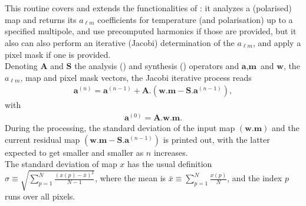 
\sloppy


 \section[map2alm\_iterative*]{ }
\label{sub:map2alm_iterative}
\author{Eric Hivon}

\begin{facility}
{This routine covers and extends the functionalities of : it
analyzes a (polarised)  map and returns
its $a_{\ell m}$ coefficients for temperature (and polarisation) up to a specified
multipole, and use precomputed harmonics if those
are provided, but it also can also perform an iterative (Jacobi) determination of the $a_{\ell m}$, and
apply a pixel mask if one is provided.\\
\newcommand{\bA}{\textbf{A}}
\newcommand{\bS}{\textbf{S}}
\newcommand{\ba}{\textbf{a}}
\newcommand{\bm}{\textbf{m}}
\newcommand{\bw}{\textbf{w}}
Denoting $\bA$ and $\bS$ the 
analysis  () and
synthesis ()
operators and  $\ba, \bm$ and $\bw$, the $a_{\ell m}$, map and pixel mask vectors, the
Jacobi iterative process reads 
\begin{eqnarray}
	\label{eq:map2alm_it_a}
	\ba^{(n)} = \ba^{(n-1)} + \bA. \left( \bw.\bm - \bS .\ba^{(n-1)} \right),
\end{eqnarray}
with
\begin{eqnarray}
	\label{eq:map2alm_it_b}
	\ba^{(0)} = \bA.\bw.\bm.
\end{eqnarray}
%
During the processing, the standard deviation of the input map $\left(\bw.\bm\right)$ 
and the current residual map $\left(\bw.\bm - \bS .\ba^{(n-1)}\right)$ is printed out, with the latter expected
to get smaller and smaller as $n$ increases.\\
The standard deviation of map $x$ has the usual definition
$\sigma \equiv \sqrt{\sum_{p=1}^{N}\frac{(x(p)-\bar{x})^2}{N-1}}$, where the mean is
$\bar{x} \equiv  \sum_{p=1}^{N} \frac{x(p)}{N}$, and the index $p$ runs over all pixels.%
}
\end{facility}
